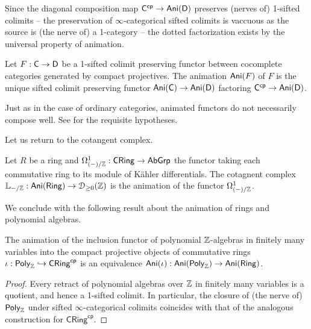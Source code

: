 Since the diagonal composition map $\mathsf{C}^{\mathsf{cp}}\to\mathsf{Ani}(\mathsf{D})$ preserves (nerves of) 1-sifted colimits -- the preservation of $\infty$-categorical sifted colimits is vaccuous as the source is (the nerve of) a 1-category -- the dotted factorization exists by the universal property of animation. 
\begin{definition}\label{def: animation of a functor}
    Let $F:\mathsf{C}\to\mathsf{D}$ be a 1-sifted colimit preserving functor between cocomplete categories generated by compact projectives. The animation $\mathsf{Ani}(F)$ of $F$ is the unique sifted colimit preserving functor $\mathsf{Ani}(\mathsf{C})\to\mathsf{Ani}(\mathsf{D})$ factoring $\mathsf{C}^{\mathsf{cp}}\to\mathsf{Ani}(\mathsf{D})$. 
\end{definition}
\begin{remark}
    Just as in the case of ordinary categories, animated functors do not necessarily compose well. See \cite[Prop. 5.15]{PurityFlatCohomology} for the requisite hypotheses. 
\end{remark}
Let us return to the cotangent complex. 
\begin{example}
    Let $R$ be a ring and $\Omega^{1}_{(-)/\mathbb{Z}}:\mathsf{CRing}\to\mathsf{AbGrp}$ the functor taking each commutative ring to its module of K\"{a}hler differentials. The cotagnent complex $\mathbb{L}_{-/\mathbb{Z}}:\mathsf{Ani}(\mathsf{Ring})\to\EuScript{D}_{\geq0}(\mathbb{Z})$ is the animation of the functor $\Omega^{1}_{(-)/\mathbb{Z}}$. 
\end{example}
We conclude with the following result about the animation of rings and polynomial algebras. 
\begin{proposition}\label{prop: animation of rings and poly algebras agree}
    The animation of the inclusion functor of polynomial $\mathbb{Z}$-algebras in finitely many variables into the compact projective objects of commutative rings $\iota:\mathsf{Poly}_{\mathbb{Z}}\hookrightarrow\mathsf{CRing}^{\mathsf{cp}}$ is an equivalence $\mathsf{Ani}(\iota):\mathsf{Ani}(\mathsf{Poly}_{\mathbb{Z}})\to \mathsf{Ani}(\mathsf{Ring})$. 
\end{proposition}
\begin{proof}
    Every retract of polynomial algebras over $\mathbb{Z}$ in finitely many variables is a quotient, and hence a 1-sifted colimit. In particular, the closure of (the nerve of) $\mathsf{Poly}_{\mathbb{Z}}$ under sifted $\infty$-categorical colimits coincides with that of the analogous construction for $\mathsf{CRing}^{\mathsf{cp}}$. 
\end{proof}